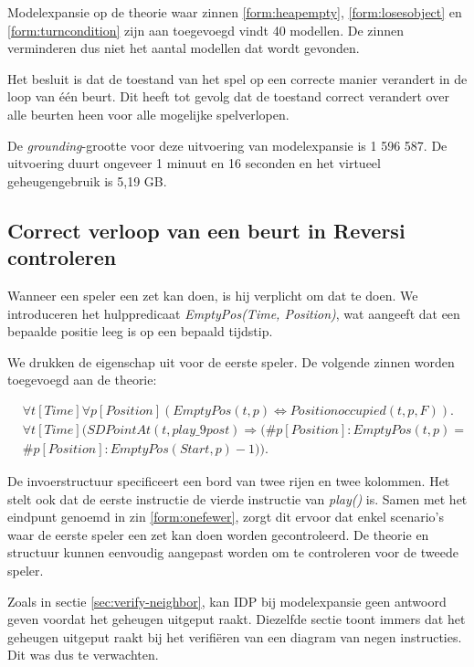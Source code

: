 Modelexpansie op de theorie waar zinnen \ref{form:heapempty}, \ref{form:losesobject} en \ref{form:turncondition} zijn aan toegevoegd vindt 40 modellen. De zinnen verminderen dus niet het aantal modellen dat wordt gevonden.

Het besluit is dat de toestand van het spel op een correcte manier verandert in de loop van \'e\'en beurt. Dit heeft tot gevolg dat de toestand correct verandert over alle beurten heen voor alle mogelijke spelverlopen.

De \textit{grounding}-grootte voor deze uitvoering van modelexpansie is 1 596 587. De uitvoering duurt ongeveer 1 minuut en 16 seconden en het virtueel geheugengebruik is 5,19 GB.

\subsection{Correct verloop van een beurt in Reversi controleren}

Wanneer een speler een zet kan doen, is hij verplicht om dat te doen. We introduceren het hulppredicaat \textit{EmptyPos(Time, Position)}, wat aangeeft dat een bepaalde positie leeg is op een bepaald tijdstip.

We drukken de eigenschap uit voor de eerste speler. De volgende zinnen worden toegevoegd aan de theorie:

\begin{align}
	&\forall{t}[Time]\forall{p}[Position](EmptyPos(t, p) \Leftrightarrow Positionoccupied(t, p, F)).\label{form:emptypos} \\
	\nonumber &\forall{t}[Time](SDPointAt(t, play\_9post) \Rightarrow (\#{p [Position] : EmptyPos(t, p)} = \\ &\#{p [Position] : EmptyPos(Start, p)} - 1)).\label{form:onefewer}
\end{align}

De invoerstructuur specificeert een bord van twee rijen en twee kolommen. Het stelt ook dat de eerste instructie de vierde instructie van \textit{play()} is. Samen met het eindpunt genoemd in zin \ref{form:onefewer}, zorgt dit ervoor dat enkel scenario's waar de eerste speler een zet kan doen worden gecontroleerd. De theorie en structuur kunnen eenvoudig aangepast worden om te controleren voor de tweede speler.

Zoals in sectie \ref{sec:verify-neighbor}, kan IDP bij modelexpansie geen antwoord geven voordat het geheugen uitgeput raakt. Diezelfde sectie toont immers dat het geheugen uitgeput raakt bij het verifi\"eren van een diagram van negen instructies. Dit was dus te verwachten.

